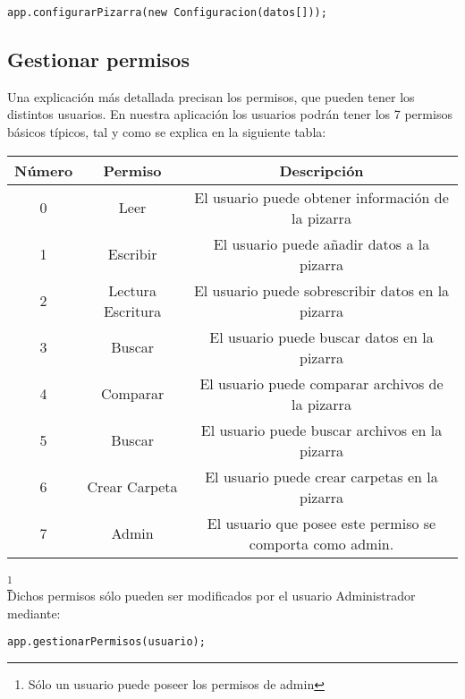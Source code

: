 \begin{center}
\texttt{app.configurarPizarra(new Configuracion(datos[]));}
\end{center}

\subsection{Gestionar permisos}
Una explicación más detallada precisan los permisos, que pueden tener los distintos usuarios. En nuestra aplicación los usuarios podrán tener los 7 permisos básicos típicos, tal y como se explica en la siguiente tabla: \\

\begin{center}
\begin{tabular}{|c|c|c|}
\hline
Número & Permiso  & Descripción \\
\hline
0& Leer & El usuario puede obtener información de la pizarra\\
1& Escribir & El usuario puede añadir datos a la pizarra\\
2& Lectura Escritura & El usuario puede sobrescribir datos en la pizarra\\
3& Buscar & El usuario puede buscar datos en la pizarra\\
4& Comparar & El usuario puede comparar archivos de la pizarra\\
5& Buscar & El usuario puede buscar archivos en la pizarra\\
6& Crear Carpeta & El usuario puede crear carpetas en la pizarra\\
7& Admin & El usuario que posee este permiso se comporta como admin.\\
\hline
\end{tabular}
\end{center}
\footnote{Sólo un usuario puede poseer los permisos de admin}\\

Dichos permisos sólo pueden ser modificados por el usuario Administrador mediante:

\begin{center}
\texttt{app.gestionarPermisos(usuario);}
\end{center}


